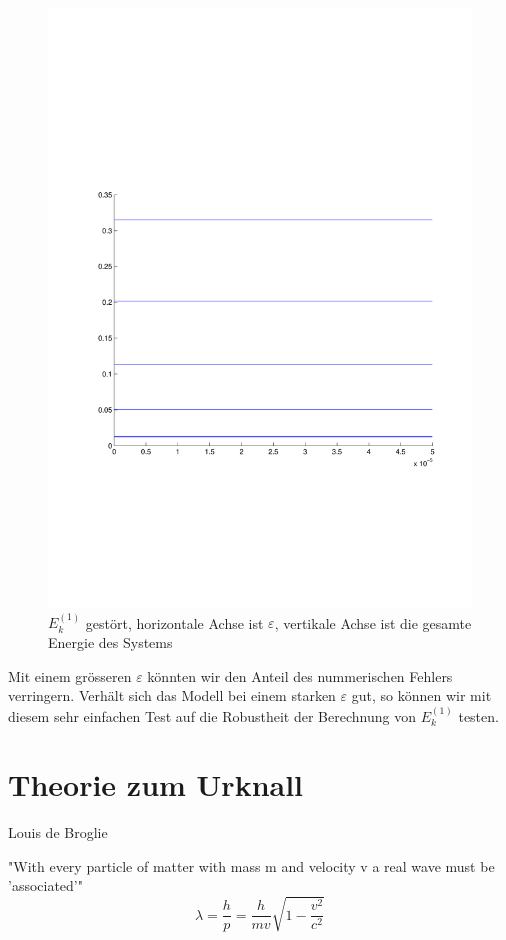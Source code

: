 \begin{refsection}
\begin{figure}
 \centering
 \includegraphics[width=12cm,clip=true,trim=2cm 7cm 1cm 8cm]{efeld/Energie_gestoert.pdf}
 \caption{$E_k^{(1)}$ gest\"ort, horizontale Achse ist $\varepsilon$, vertikale Achse ist die gesamte Energie des Systems}
 \label{abb:efeld_E_gestoert}
\end{figure}

Mit einem gr\"osseren $\varepsilon$ k\"onnten wir den Anteil des nummerischen Fehlers verringern. 
Verh\"alt sich das Modell bei einem starken $\varepsilon$ gut, so k\"onnen wir mit diesem sehr einfachen Test
auf die Robustheit der Berechnung von $E_k^{(1)}$ testen.




\section{Theorie zum Urknall}
Louis de Broglie

"With every particle of matter with mass m and velocity v a real wave must be 'associated'"
\[
  \lambda = \frac{h}{p} = \frac {h}{{m}{v}} \sqrt{1 - \frac{v^2}{c^2}}
\]



\printbibliography[heading=subbibliography]
\end{refsection}
